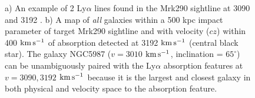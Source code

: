 \documentclass[twocolumn,tighten]{aastex6}
\begin{document}
\begin{figure}[t!]
  \caption{\small{a) An example of 2 Ly$\alpha$ lines found in the Mrk290 sightline at 3090 and 3192 . b) A map of \textit{all} galaxies within a 500 kpc impact parameter of target Mrk290 sightline and with velocity ($cz$) within 400 $\rm km\, s^{-1}$ of absorption detected at 3192 $\rm km\, s^{-1}$ (central black star). The galaxy NGC5987 ($v=3010$ $\rm km\, s^{-1}$, inclination = $65^{\circ}$) can be unambiguously paired with the Ly$\alpha$ absorption features at $v=3090, 3192$ $\rm km\, s^{-1}$ because it is the largest and closest galaxy in both physical and velocity space to the absorption feature.}}
\vspace{5pt}
\end{figure}
\end{document}
